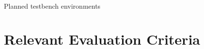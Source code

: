 Planned testbench environments



\section{Relevant Evaluation Criteria} %
\label{sec:relevant_evaluation_criteria}

% 
% 
% 
% 


